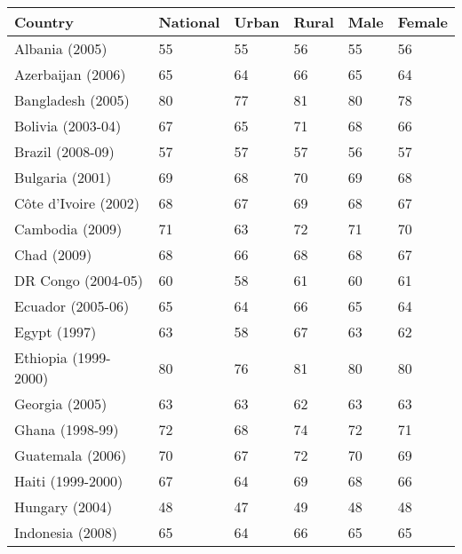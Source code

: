 \begin{multicols}{2}

}{}

\IfFileExists{./Plots/C.P1.HS.1.6.pdf}{\texttt{[image: \{./Plots/C.P1.HS.1.6]}.pdf}}{}
\end{multicols}
\clearpage

 \label{tab:title} 
      \begin{tabular}{L{2.0cm} R{0.7cm} R{0.7cm} R{0.7cm} R{0.7cm} R{0.7cm}}
      \toprule
      Country & National & Urban & Rural & Male & Female \\
      \midrule
        Albania (2005) & 55 & 55 & 56 & 55 & 56 \\
        Azerbaijan (2006) & 65 & 64 & 66 & 65 & 64 \\
        Bangladesh (2005) & 80 & 77 & 81 & 80 & 78 \\
        Bolivia (2003-04) & 67 & 65 & 71 & 68 & 66 \\
        Brazil (2008-09) & 57 & 57 & 57 & 56 & 57 \\
        Bulgaria (2001) & 69 & 68 & 70 & 69 & 68 \\
        C\^{o}te d'Ivoire (2002) & 68 & 67 & 69 & 68 & 67 \\
        Cambodia (2009) & 71 & 63 & 72 & 71 & 70 \\
        Chad (2009) & 68 & 66 & 68 & 68 & 67 \\
        DR Congo (2004-05) & 60 & 58 & 61 & 60 & 61 \\
        Ecuador (2005-06) & 65 & 64 & 66 & 65 & 64 \\
        Egypt (1997) & 63 & 58 & 67 & 63 & 62 \\
        Ethiopia (1999-2000) & 80 & 76 & 81 & 80 & 80 \\
        Georgia (2005) & 63 & 63 & 62 & 63 & 63 \\
        Ghana (1998-99) & 72 & 68 & 74 & 72 & 71 \\
        Guatemala (2006) & 70 & 67 & 72 & 70 & 69 \\
        Haiti (1999-2000) & 67 & 64 & 69 & 68 & 66 \\
        Hungary (2004) & 48 & 47 & 49 & 48 & 48 \\
        Indonesia (2008) & 65 & 64 & 66 & 65 & 65 \\

\end{tabular}
